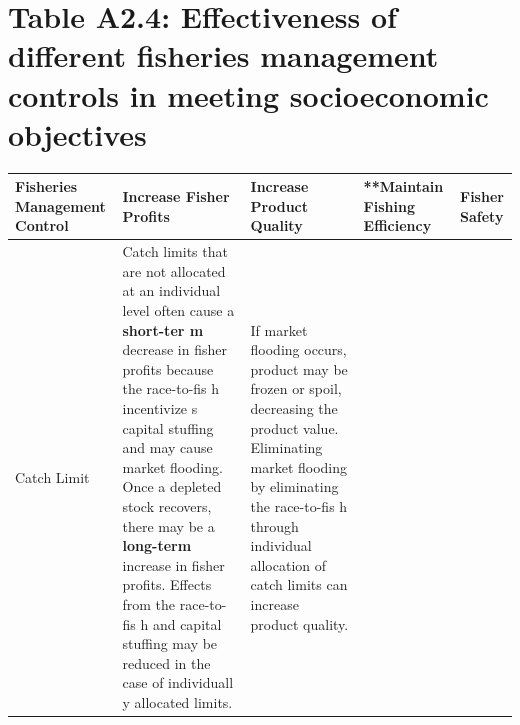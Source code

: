 \documentclass[]{book}
\begin{document}
\section{Table A2.4: Effectiveness of different fisheries management
controls in meeting socioeconomic
objectives}\label{table-a2.4-effectiveness-of-different-fisheries-management-controls-in-meeting-socioeconomic-objectives}

\begin{longtable}[]{@{}lllll@{}}
\toprule
\begin{minipage}[b]{0.17\columnwidth}\raggedright\strut
\textbf{Fisheries Management Control}\strut
\end{minipage} & \begin{minipage}[b]{0.17\columnwidth}\raggedright\strut
\textbf{Increase Fisher Profits}\strut
\end{minipage} & \begin{minipage}[b]{0.17\columnwidth}\raggedright\strut
\textbf{Increase Product Quality}\strut
\end{minipage} & \begin{minipage}[b]{0.17\columnwidth}\raggedright\strut
**Maintain Fishing Efficiency\emph{ }\strut
\end{minipage} & \begin{minipage}[b]{0.17\columnwidth}\raggedright\strut
\textbf{Fisher Safety}\strut
\end{minipage}\tabularnewline
\midrule
\endhead
\begin{minipage}[t]{0.17\columnwidth}\raggedright\strut
Catch Limit\strut
\end{minipage} & \begin{minipage}[t]{0.17\columnwidth}\raggedright\strut
Catch limits that are not allocated at an individual level often cause a
\textbf{short-ter m} decrease in fisher profits because the race-to-fis
h incentivize s capital stuffing and may cause market flooding. Once a
depleted stock recovers, there may be a \textbf{long-term } increase in
fisher profits. Effects from the race-to-fis h and capital stuffing may
be reduced in the case of individuall y allocated limits.\strut
\end{minipage} & \begin{minipage}[t]{0.17\columnwidth}\raggedright\strut
If market flooding occurs, product may be frozen or spoil, decreasing
the product value. Eliminating market flooding by eliminating the
race-to-fis h through individual allocation of catch limits can increase
product quality.\strut
\end{minipage} & \begin{minipage}[t]{0.17\columnwidth}\raggedright\strut

\end{minipage}
\end{longtable}
\end{document}
